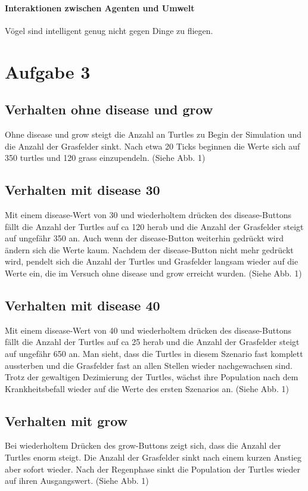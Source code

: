 \documentclass[10pt]{article}%
\theoremstyle{nonumberplain}
\begin{document}
\paragraph{Interaktionen zwischen Agenten und Umwelt}
Vögel sind intelligent genug nicht gegen Dinge zu fliegen.

\section{Aufgabe 3}

\subsection{Verhalten ohne disease und grow}
Ohne disease und grow steigt die Anzahl an Turtles zu Begin der Simulation und die Anzahl der Grasfelder sinkt. Nach etwa 20 Ticks beginnen die Werte sich auf 350 turtles und 120 grass einzupendeln. (Siehe Abb. 1) 


\subsection{Verhalten mit disease 30}
Mit einem disease-Wert von 30 und wiederholtem drücken des disease-Buttons fällt die Anzahl der Turtles auf ca 120 herab und die Anzahl der Grasfelder steigt auf ungefähr 350 an. Auch wenn der disease-Button weiterhin gedrückt wird ändern sich die Werte kaum. Nachdem der disease-Button nicht mehr gedrückt wird, pendelt sich die Anzahl der Turtles und Grasfelder langsam wieder auf die Werte ein, die im Versuch ohne disease und grow erreicht wurden. (Siehe Abb. 1)  


\subsection{Verhalten mit disease 40}
Mit einem disease-Wert von 40 und wiederholtem drücken des disease-Buttons fällt die Anzahl der Turtles auf ca 25 herab und die Anzahl der Grasfelder steigt auf ungefähr 650 an. Man sieht, dass die Turtles in diesem Szenario fast komplett aussterben und die Grasfelder fast an allen Stellen wieder nachgewachsen sind.
Trotz der gewaltigen Dezimierung der Turtles, wächst ihre Population nach dem Krankheitsbefall wieder auf die Werte des ersten Szenarios an. (Siehe Abb. 1) 


\subsection{Verhalten mit grow}
Bei wiederholtem Drücken des grow-Buttons zeigt sich, dass die Anzahl der Turtles enorm steigt. Die Anzahl der Grasfelder sinkt nach einem kurzen Anstieg aber sofort wieder. Nach der Regenphase sinkt die Population der Turtles wieder auf ihren Ausgangswert. (Siehe Abb. 1) 
\end{document}
